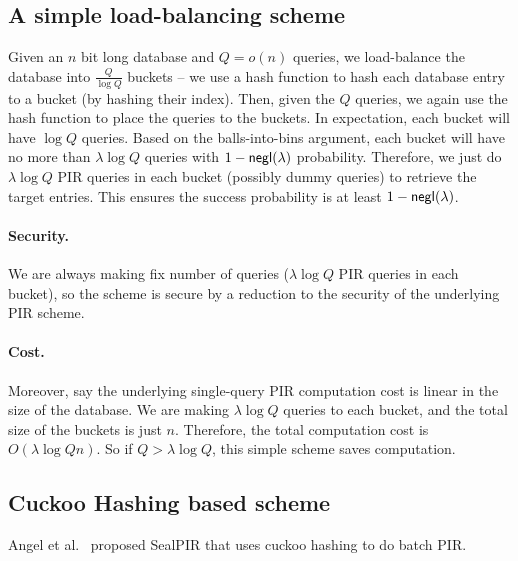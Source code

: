      
\subsection{A simple load-balancing scheme}

Given an $n$ bit long database and $Q=o(n)$ queries, we load-balance the database into $\frac{Q}{\log Q}$ buckets -- we use a hash function to hash each database entry to a bucket (by hashing their index).
Then, given the $Q$ queries, we again use the hash function to place the queries to the buckets. 
In expectation, each bucket will have $\log Q$ queries. 
Based on the balls-into-bins argument, each bucket will have no more than $\lambda \log Q$ queries with $1-{\sf negl}(\lambda)$ probability.
Therefore, we just do $\lambda \log Q$ PIR queries in each bucket (possibly dummy queries) to retrieve the target entries. 
This ensures the success probability is at least $1-{\sf negl}(\lambda)$.

\paragraph{Security.}
We are always making fix number of queries ($\lambda \log Q$ PIR queries in each bucket), so the scheme is secure by a reduction to the security of the underlying PIR scheme.

\paragraph{Cost.}
Moreover, say the underlying single-query PIR computation cost is linear in the size of the database.
We are making $\lambda \log Q$ queries to each bucket, and the total size of the buckets is just $n$. 
Therefore, the total computation cost is $O(\lambda \log Q n)$. 
So if $Q>\lambda \log Q$, this simple scheme saves computation.


     
     
\subsection{Cuckoo Hashing based scheme~\cite{angel2018pir}}

Angel et al.~\cite{angel2018pir} proposed SealPIR that uses cuckoo hashing to do batch PIR.
    
